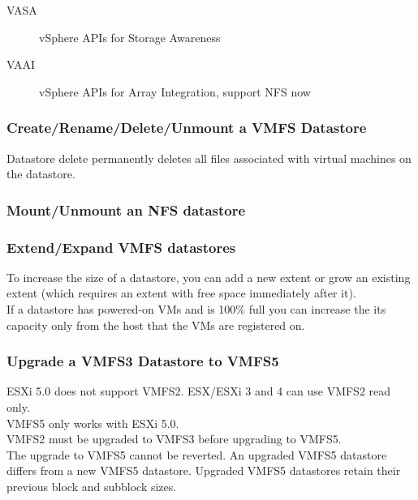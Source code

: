 \begin{description}

\item[VASA] vSphere APIs for Storage Awareness

\item[VAAI] vSphere APIs for Array Integration, support NFS now

\end{description}

\subsubsection{Create/Rename/Delete/Unmount a VMFS Datastore}

Datastore delete permanently deletes all files associated with virtual
machines on the datastore.

\subsubsection{Mount/Unmount an NFS datastore}

\subsubsection{Extend/Expand VMFS datastores}

To increase the size of a datastore, you can add a new extent or grow an
existing extent (which requires an extent with free space immediately after
it).\\

If a datastore has powered-on VMs and is 100\% full you can increase the its
capacity only from the host that the VMs are registered on.

\subsubsection{Upgrade a VMFS3 Datastore to VMFS5}

ESXi 5.0 does not support VMFS2. ESX/ESXi 3 and 4 can use VMFS2 read only.\\

VMFS5 only works with ESXi 5.0.\\

VMFS2 must be upgraded to VMFS3 before upgrading to VMFS5.\\

The upgrade to VMFS5 cannot be reverted. An upgraded VMFS5 datastore differs
from a new VMFS5 datastore. Upgraded VMFS5 datastores retain their previous
block and subblock sizes.

